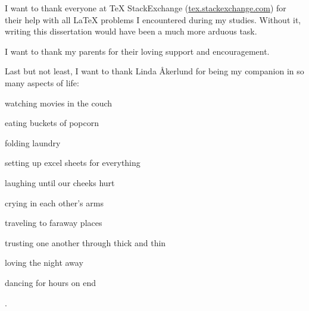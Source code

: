 \begin{acknowledgements}
  I want to thank everyone at \TeX{} StackExchange
  ({\url{tex.stackexchange.com}}) for their help with all
  \LaTeX{} problems I encountered during my studies.
  Without it, writing this dissertation would have been a much more arduous
  task.

  I want to thank my parents for their loving support and encouragement.

  Last but not least, I want to thank Linda \r{A}kerlund for being my companion
  in so many aspects of life:
  \begin{inlinelist}[itemjoin={, }, itemjoin*={, and}]
    \item watching movies in the couch
    \item eating buckets of popcorn
    \item folding laundry
    \item setting up excel sheets for everything
    \item laughing until our cheeks hurt
    \item crying in each other's arms
    \item traveling to faraway places
    \item trusting one another through thick and thin
    \item loving the night away
    \item dancing for hours on end
  \end{inlinelist}.
\end{acknowledgements}
